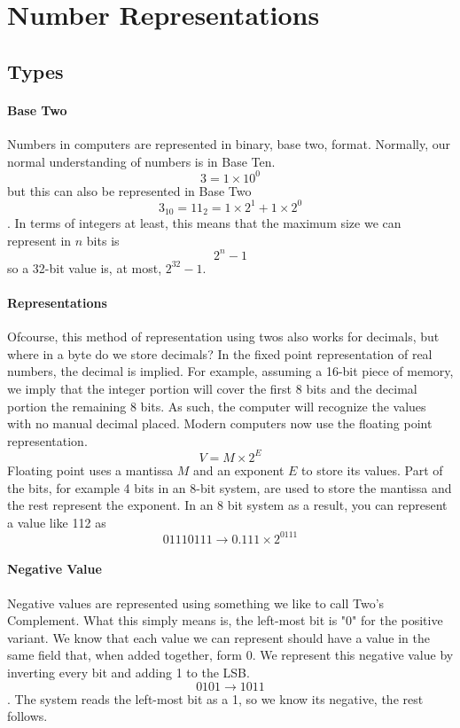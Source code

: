 \section{Number Representations}
\subsection{Types}
\paragraph{Base Two}
Numbers in computers are represented in binary, base two, format. Normally, our normal understanding of numbers is in Base Ten. \[3 = 1 \times 10^0\] but this can also be represented in Base Two \[3_10 = 11_2 = 1 \times 2^1 + 1 \times 2^0\]. In terms of integers at least, this means that the maximum size we can represent in $n$ bits is \[2^n - 1\] so a 32-bit value is, at most, $2^{32} - 1$.
\paragraph{Representations}
Ofcourse, this method of representation using twos also works for decimals, but where in a byte do we store decimals? In the fixed point representation of real numbers, the decimal is implied. For example, assuming a 16-bit piece of memory, we imply that the integer portion will cover the first 8 bits and the decimal portion the remaining 8 bits. As such, the computer will recognize the values with no manual decimal placed.
Modern computers now use the floating point representation. \[V = M \times 2^E\] Floating point uses a mantissa $M$ and an exponent $E$ to store its values. Part of the bits, for example 4 bits in an 8-bit system, are used to store the mantissa and the rest represent the exponent. In an 8 bit system as a result, you can represent a value like 112 as \[01110111 \rightarrow 0.111 \times 2^{0111}\]
\paragraph{Negative Value}
Negative values are represented using something we like to call Two's Complement. What this simply means is, the left-most bit is "0" for the positive variant. We know that each value we can represent should have a value in the same field that, when added together, form $0$. We represent this negative value by inverting every bit and adding 1 to the LSB. \[ 0101 \rightarrow 1011\]. The system reads the left-most bit as a 1, so we know its negative, the rest follows.


